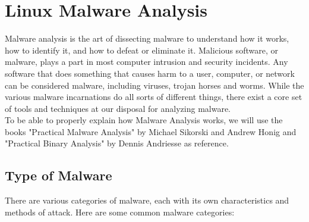 \chapter{Linux Malware Analysis}
\thispagestyle{chapterfancy}

Malware analysis is the art of dissecting malware to understand how it works, how to identify it, and how to defeat or eliminate it. Malicious software, or malware, plays a part in most computer intrusion and security incidents. Any software that does something that causes harm to a user, computer, or network can be considered malware, including viruses, trojan horses and worms. While the various malware incarnations do all sorts of different things, there exist a core set of tools and techniques at our disposal for analyzing malware. \\
To be able to properly explain how Malware Analysis works, we will use the books "Practical Malware Analysis" by Michael Sikorski and Andrew Honig \cite{sikorski2012practical} and "Practical Binary Analysis" by Dennis Andriesse \cite{andriesse2018practical} \cite{prince2024understanding} as reference. \\

\section{Type of Malware}
There are various categories of malware, each with its own characteristics and methods of attack. Here are some common malware categories:

